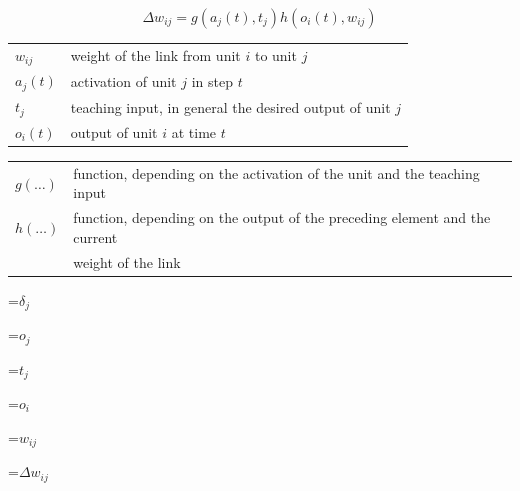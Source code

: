 {\newpage
\clearpage
\samepage \begin{displaymath}\Delta w_{ij} = g(a_{j}(t), t_{j}) h(o_{i}(t),w_{ij})
\end{displaymath}
}

{\newpage
\clearpage
\samepage \begin{tabular}{ll}
  $w_{ij}$     & weight of the link from unit $i$ to unit $j$\\ 
  $a_{j}(t)$   & activation of unit $j$ in step $t$\\ 
  $t_{j}$      & teaching input, in general the desired output of unit $j$\\  
  $o_{i}(t)$   & output of unit $i$ at time $t$\\ 
\end{tabular}
}

{\newpage
\clearpage
\samepage \begin{tabular}{ll}
  $g(\dots)$   & function, depending on the activation of the 
                 unit and the teaching input\\ 
  $h(\dots)$   & function, depending on the output of the
                 preceding element and the current\\ 
               & weight of the link\\ 
\end{tabular}
}

{\newpage
\clearpage
\samepage \setbox\sizebox=\hbox{$\delta_{j}$}\box\sizebox
}

{\newpage
\clearpage
\samepage \setbox\sizebox=\hbox{$o_{j}$}\box\sizebox
}

{\newpage
\clearpage
\samepage \setbox\sizebox=\hbox{$t_{j}$}\box\sizebox
}

{\newpage
\clearpage
\samepage \setbox\sizebox=\hbox{$o_{i}$}\box\sizebox
}

{\newpage
\clearpage
\samepage \setbox\sizebox=\hbox{$w_{ij}$}\box\sizebox
}

{\newpage
\clearpage
\samepage \setbox\sizebox=\hbox{$\Delta w_{ij}$}\box\sizebox
}

